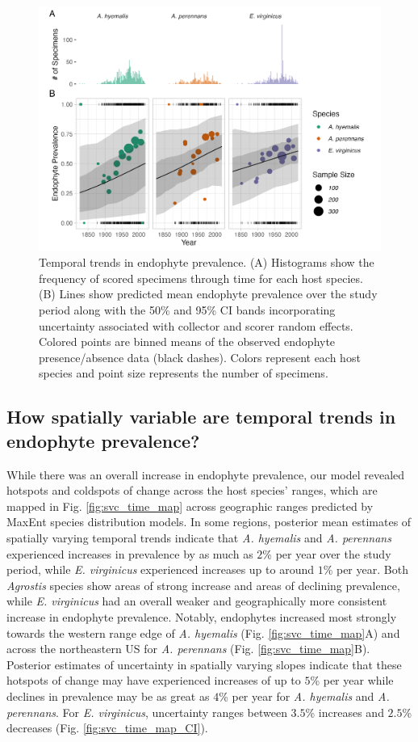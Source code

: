 \documentclass[11pt]{article}
\begin{document}
\begin{figure}[H]
	\centering
	\includegraphics[width = \linewidth]{../Plots/year_plot.png}
	\caption[Temporal trends in endophyte prevalence.]{Temporal trends in endophyte prevalence. (A) Histograms show the frequency of scored specimens through time for each host species. (B) Lines show predicted mean endophyte prevalence over the study period along with the 50\%  and 95\% CI bands incorporating uncertainty associated with collector and scorer random effects. Colored points are binned means of the observed endophyte presence/absence data (black dashes). Colors represent each host species and point size represents the number of specimens.}
	\label{fig:temporal}
\end{figure}

\subsection*{How spatially variable are temporal trends in endophyte prevalence?}
While there was an overall increase in endophyte prevalence, our model revealed hotspots and coldspots of change across the host species' ranges, which are mapped in Fig. \ref{fig:svc_time_map} across geographic ranges predicted by MaxEnt species distribution models.
In some regions, posterior mean estimates of spatially varying temporal trends indicate that \emph{A. hyemalis} and \emph{A. perennans} experienced increases in prevalence by as much as $2$\% per year over the study period, while  \emph{E. virginicus} experienced increases up to around $1$\% per year. 
Both \emph{Agrostis} species show areas of strong increase and areas of declining prevalence, while \emph{E. virginicus} had an overall weaker and geographically more consistent increase in endophyte prevalence.
Notably, endophytes increased most strongly towards the western range edge of \emph{A. hyemalis} (Fig. \ref{fig:svc_time_map}A) and across the northeastern US for \emph{A. perennans} (Fig. \ref{fig:svc_time_map}B). 
Posterior estimates of uncertainty in spatially varying slopes indicate that these hotspots of change may have experienced increases of up to $5$\% per year while declines in prevalence may be as great as $4$\% per year for \emph{A. hyemalis} and \emph{A. perennans}.
For \emph{E. virginicus}, uncertainty ranges between $3.5$\% increases and $2.5$\% decreases (Fig. \ref{fig:svc_time_map_CI}).
\end{document}
